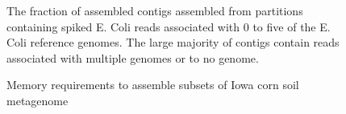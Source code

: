 \documentclass[11pt]{article} %
\begin{document}
\begin{figure}[h!]
\caption{The fraction of assembled contigs assembled from partitions containing spiked E. Coli reads associated with 0 to five of the E. Coli reference genomes.  The large majority of contigs contain reads associated with multiple genomes or to no genome.}
\label{fractionassembled}
\end{figure}

\begin{figure}[h!]
\caption{Memory requirements to assemble subsets of Iowa corn soil metagenome}
\label{memory}
\end{figure}
\end{document}
